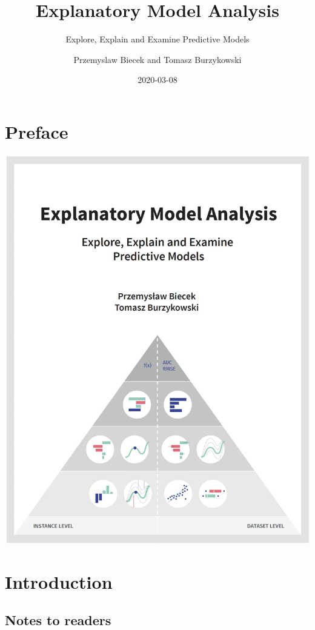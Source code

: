 \documentclass[]{krantz}
\title{Explanatory Model Analysis}
\subtitle{Explore, Explain and Examine Predictive Models}
\author{Przemyslaw Biecek and Tomasz Burzykowski}
\date{2020-03-08}
\begin{document}
\maketitle

{
\hypersetup{linkcolor=}
\setcounter{tocdepth}{1}
\tableofcontents
}
\listoftables
\listoffigures
\hypertarget{preface}{%
\chapter*{Preface}\label{preface}}

\begin{center}\includegraphics[width=0.99\linewidth]{figure/front4} \end{center}

\hypertarget{introduction}{%
\chapter{Introduction}\label{introduction}}

\hypertarget{notes-to-readers}{%
\section{Notes to readers}\label{notes-to-readers}}
\end{document}
